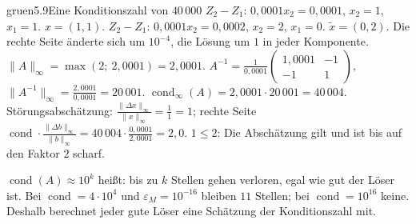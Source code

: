 \begin{loesungkarte}{gruen}{5.9}{Eine Konditionszahl von $40\,000$}
$Z_2 - Z_1$: $0{,}0001x_2 = 0{,}0001$, $x_2 = 1$, $x_1 = 1$. $x = (1, 1)$.
$Z_2 - Z_1$: $0{,}0001x_2 = 0{,}0002$, $x_2 = 2$, $x_1 = 0$. $\tilde x = (0, 2)$. Die rechte Seite änderte sich um $10^{-4}$, die Lösung um $1$ in jeder Komponente.
$\|A\|_\infty = \max(2;\ 2{,}0001) = 2{,}0001$. $A^{-1} = \frac1{0{,}0001}\begin{pmatrix}1{,}0001 & -1\\ -1 & 1\end{pmatrix}$, $\|A^{-1}\|_\infty = \frac{2{,}0001}{0{,}0001} = 20\,001$. $\operatorname{cond}_\infty(A) = 2{,}0001\cdot20\,001 = 40\,004$. \\
Störungsabschätzung: $\frac{\|\Delta x\|_\infty}{\|x\|_\infty} = \frac11 = 1$; rechte Seite $\operatorname{cond}\cdot\frac{\|\Delta b\|_\infty}{\|b\|_\infty} = 40\,004\cdot\frac{0{,}0001}{2{,}0001} = 2{,}0$. $1\le2$: Die Abschätzung gilt und ist bis auf den Faktor $2$ scharf.
\begin{mitnehmen}\kastentext
$\operatorname{cond}(A)\approx10^{k}$ heißt: bis zu $k$ Stellen gehen verloren, egal wie gut der Löser ist. Bei $\operatorname{cond} = 4\cdot10^{4}$ und $\varepsilon_M = 10^{-16}$ bleiben $11$ Stellen; bei $\operatorname{cond} = 10^{16}$ keine. Deshalb berechnet jeder gute Löser eine Schätzung der Konditionszahl mit.
\end{mitnehmen}
\end{loesungkarte}

